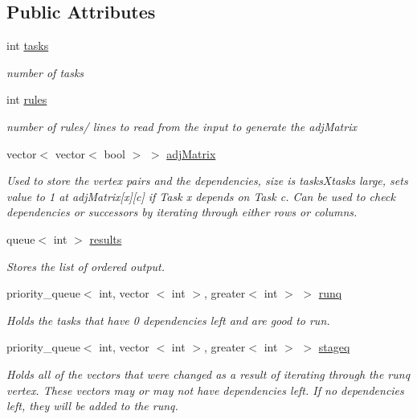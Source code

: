 \subsection*{\-Public \-Attributes}
\begin{DoxyCompactItemize}
\item 
int \hyperlink{structGraph_a4d2a4b0944a121f0415137f0f1538e4a}{tasks}
\begin{DoxyCompactList}\small\item\em number of tasks \end{DoxyCompactList}\item 
int \hyperlink{structGraph_a7d540d84c08510deb0f2b0692ed5afcd}{rules}
\begin{DoxyCompactList}\small\item\em number of rules/ lines to read from the input to generate the adj\-Matrix \end{DoxyCompactList}\item 
vector$<$ vector$<$ bool $>$ $>$ \hyperlink{structGraph_a25439b7cad72199504e1fdd1fbe70130}{adj\-Matrix}
\begin{DoxyCompactList}\small\item\em \-Used to store the vertex pairs and the dependencies, size is tasks\-Xtasks large, sets value to 1 at adj\-Matrix\mbox{[}x\mbox{]}\mbox{[}c\mbox{]} if \-Task x depends on \-Task c. \-Can be used to check dependencies or successors by iterating through either rows or columns. \end{DoxyCompactList}\item 
queue$<$ int $>$ \hyperlink{structGraph_a97da3b3f97afbd334c70b354a3be4551}{results}
\begin{DoxyCompactList}\small\item\em \-Stores the list of ordered output. \end{DoxyCompactList}\item 
priority\-\_\-queue$<$ int, vector\*
$<$ int $>$, greater$<$ int $>$ $>$ \hyperlink{structGraph_af6491f1c520f1cbff611984f0da0167a}{runq}
\begin{DoxyCompactList}\small\item\em \-Holds the tasks that have 0 dependencies left and are good to run. \end{DoxyCompactList}\item 
priority\-\_\-queue$<$ int, vector\*
$<$ int $>$, greater$<$ int $>$ $>$ \hyperlink{structGraph_a8e75929d511a2d1808f89b7a899c6f12}{stageq}
\begin{DoxyCompactList}\small\item\em \-Holds all of the vectors that were changed as a result of iterating through the runq vertex. \-These vectors may or may not have dependencies left. \-If no dependencies left, they will be added to the runq. \end{DoxyCompactList}\item 

\end{DoxyCompactItemize}
